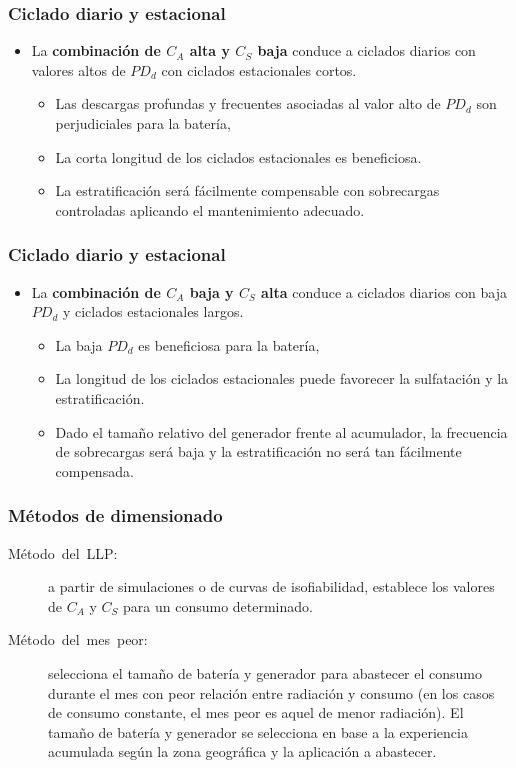 \documentclass[serif, xcolor=dvipsnames]{beamer}
\begin{document}
\begin{frame}
\frametitle{Ciclado diario y estacional}
\begin{itemize}
\item La \textbf{combinación de $C_{A}$ alta y $C_{S}$ baja }conduce a
ciclados diarios con valores altos de $PD_{d}$ con ciclados estacionales
cortos. 

\begin{itemize}
\item Las descargas profundas y frecuentes asociadas al valor alto de $PD_{d}$
son perjudiciales para la batería, 
\item La corta longitud de los ciclados estacionales es beneficiosa. 
\item La estratificación será fácilmente compensable con sobrecargas controladas
aplicando el mantenimiento adecuado.
\end{itemize}
\end{itemize}

\end{frame}

\begin{frame}
\frametitle{Ciclado diario y estacional}
\begin{itemize}
\item La \textbf{combinación de $C_{A}$ baja y $C_{S}$ alta} conduce a
ciclados diarios con baja $PD_{d}$ y ciclados estacionales largos. 

\begin{itemize}
\item La baja $PD_{d}$ es beneficiosa para la batería, 
\item La longitud de los ciclados estacionales puede favorecer la sulfatación
y la estratificación. 
\item Dado el tamaño relativo del generador frente al acumulador, la frecuencia
de sobrecargas será baja y la estratificación no será tan fácilmente
compensada. 
\end{itemize}
\end{itemize}



\end{frame}

\begin{frame}
\frametitle{Métodos de dimensionado}
\begin{block}
{}
\begin{description}
\item [{Método~del~LLP:}] a partir de simulaciones o de curvas de isofiabilidad,
establece los valores de $C_{A}$ y $C_{S}$ para un consumo determinado.
\item [{Método~del~mes~peor:}] selecciona el tamaño de batería y generador
para abastecer el consumo durante el mes con peor relación entre radiación
y consumo (en los casos de consumo constante, el mes peor es aquel
de menor radiación). El tamaño de batería y generador se selecciona
en base a la experiencia acumulada según la zona geográfica y la aplicación
a abastecer.
\end{description}
\end{block}

\end{frame}
\end{document}
